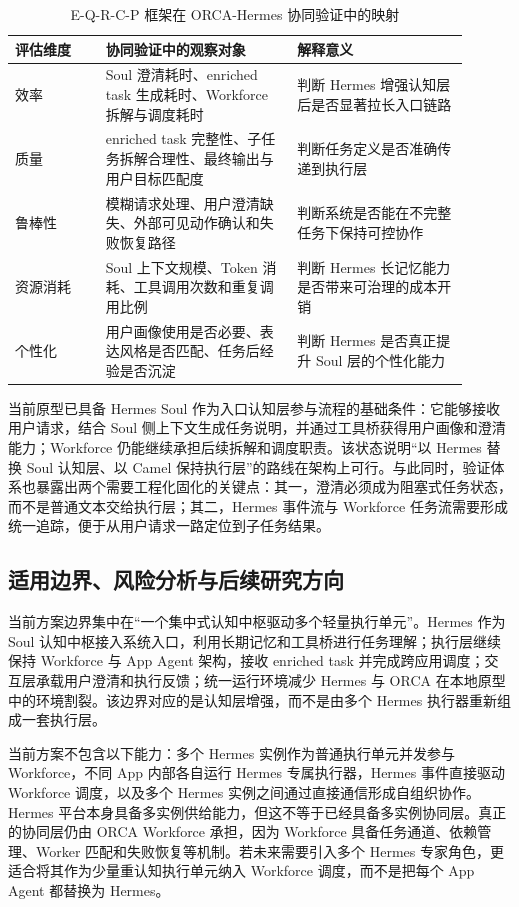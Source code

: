\begin{table}[h]
\centering
\begin{tabular}{p{0.18\linewidth}p{0.38\linewidth}p{0.34\linewidth}}
\hline
\textbf{评估维度} & \textbf{协同验证中的观察对象} & \textbf{解释意义} \\
\hline
效率 & Soul 澄清耗时、enriched task 生成耗时、Workforce 拆解与调度耗时 & 判断 Hermes 增强认知层后是否显著拉长入口链路 \\
质量 & enriched task 完整性、子任务拆解合理性、最终输出与用户目标匹配度 & 判断任务定义是否准确传递到执行层 \\
鲁棒性 & 模糊请求处理、用户澄清缺失、外部可见动作确认和失败恢复路径 & 判断系统是否能在不完整任务下保持可控协作 \\
资源消耗 & Soul 上下文规模、Token 消耗、工具调用次数和重复调用比例 & 判断 Hermes 长记忆能力是否带来可治理的成本开销 \\
个性化 & 用户画像使用是否必要、表达风格是否匹配、任务后经验是否沉淀 & 判断 Hermes 是否真正提升 Soul 层的个性化能力 \\
\hline
\end{tabular}
\caption{E-Q-R-C-P 框架在 ORCA-Hermes 协同验证中的映射}
\label{tab:rt3-eqrcp-mapping}
\end{table}

当前原型已具备 Hermes Soul 作为入口认知层参与流程的基础条件：它能够接收用户请求，结合 Soul 侧上下文生成任务说明，并通过工具桥获得用户画像和澄清能力；Workforce 仍能继续承担后续拆解和调度职责。该状态说明“以 Hermes 替换 Soul 认知层、以 Camel 保持执行层”的路线在架构上可行。与此同时，验证体系也暴露出两个需要工程化固化的关键点：其一，澄清必须成为阻塞式任务状态，而不是普通文本交给执行层；其二，Hermes 事件流与 Workforce 任务流需要形成统一追踪，便于从用户请求一路定位到子任务结果。

\subsection{适用边界、风险分析与后续研究方向}

当前方案边界集中在“一个集中式认知中枢驱动多个轻量执行单元”。Hermes 作为 Soul 认知中枢接入系统入口，利用长期记忆和工具桥进行任务理解；执行层继续保持 Workforce 与 App Agent 架构，接收 enriched task 并完成跨应用调度；交互层承载用户澄清和执行反馈；统一运行环境减少 Hermes 与 ORCA 在本地原型中的环境割裂。该边界对应的是认知层增强，而不是由多个 Hermes 执行器重新组成一套执行层。

当前方案不包含以下能力：多个 Hermes 实例作为普通执行单元并发参与 Workforce，不同 App 内部各自运行 Hermes 专属执行器，Hermes 事件直接驱动 Workforce 调度，以及多个 Hermes 实例之间通过直接通信形成自组织协作。Hermes 平台本身具备多实例供给能力，但这不等于已经具备多实例协同层。真正的协同层仍由 ORCA Workforce 承担，因为 Workforce 具备任务通道、依赖管理、Worker 匹配和失败恢复等机制。若未来需要引入多个 Hermes 专家角色，更适合将其作为少量重认知执行单元纳入 Workforce 调度，而不是把每个 App Agent 都替换为 Hermes。

